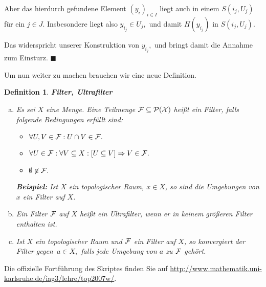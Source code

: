 \documentclass[12pt]{scrbook}   %
\newtheorem{definiX}[alles]{Definition}
\newenvironment{defini}[1]{\begin{definiX}{\bf #1}\par\rm}{\end{definiX}}
\newcommand{\qed}{\phantom{.}\hfill{$\blacksquare$}}
\begin{document}
Aber das hierdurch gefundene Element $(y_i)_{i\in I}$ liegt auch in einem
$S(i_j,U_j)$ f\"ur ein $j\in J.$ Insbesondere liegt also $y_{i_j}\in U_j,$
und damit $H(y_{i_j})$ in $S(i_j,U_j).$ 

Das widerspricht unserer Konstruktion
von $y_{i_j},$ und bringt damit die Annahme zum Einsturz.
\qed

Um nun weiter zu machen brauchen wir eine neue Definition.

\begin{defini} {Filter, Ultrafilter}
\begin{enumerate}[a)]
\item Es sei $X$ eine Menge. Eine Teilmenge $\cal F\subseteq {\cal P}(X)$ 
hei\ss t ein {\it Filter}, falls folgende Bedingungen erf\"ullt 
sind:

\begin{itemize}
\item $\forall U,V\in {\cal F}: U\cap V\in {\cal F}.$
\item $\forall U\in {\cal F}: \forall V\subseteq X: [U\subseteq V]\Rightarrow 
V\in {\cal F}.$
\item $\emptyset\not\in {\cal F}.$
\end{itemize}

{\bf Beispiel:} Ist $X$ ein topologischer Raum, $x\in X$, so sind die Umgebungen von $x$ ein Filter auf $X$.

\item Ein Filter $\cal F$ auf $X$ hei\ss t ein Ultrafilter, wenn er in keinem
gr\"o\ss eren Filter enthalten ist.

\item Ist $X$ ein topologischer Raum und $\cal F$ ein Filter auf $X$, so 
{\it konvergiert der Filter gegen}\ $a\in X,$ falls jede Umgebung von $a$ zu
$\cal F$ geh\"ort.
\end{enumerate}
\end{defini}


\begin{center}
Die offizielle Fortführung des Skriptes finden Sie auf \url{http://www.mathematik.uni-karlsruhe.de/iag3/lehre/top2007w/}.
\end{center}
\end{document}
